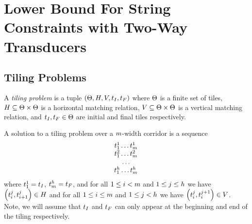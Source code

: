 
\section{Lower Bound For String Constraints with Two-Way Transducers}
\label{sec:two-way-lower}


\subsection{Tiling Problems}

\begin{definition}
    A \emph{tiling problem} is a tuple
    $\left( \Theta, H, V, t_I, t_F \right)$
    where
        $\Theta$ is a finite set of tiles,
        $H \subseteq \Theta \times \Theta$ is a horizontal matching relation,
        $V \subseteq \Theta \times \Theta$ is a vertical matching relation, and
        $t_I, t_F \in \Theta$ are initial and final tiles respectively.
\end{definition}

A solution to a tiling problem over a $m$-width corridor is a sequence
\[
    \begin{array}{c}
        t^1_1 \ldots t^1_m \\
        t^2_1 \ldots t^2_m \\
        \ldots \\
        t^h_1 \ldots t^h_m
    \end{array}
\]
where
$t^1_1 = t_I$,
$t^h_m = t_F$,
and for all
$1 \leq i < m$
and
$1 \leq j \leq h$
we have
$\left( t^j_i, t^j_{i+1} \right) \in H$
and for all
$1 \leq i \leq m$
and
$1 \leq j < h$
we have
$\left( t^j_i, t^{j+1}_i \right) \in V$.
Note, we will assume that $t_I$ and $t_F$ can only appear at the beginning and end of the tiling respectively.

